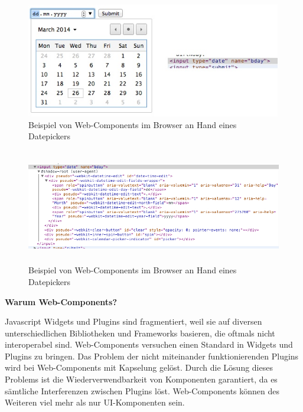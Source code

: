 \begin{figure}[h]
\centering
\includegraphics[height=5.0cm]{images/datepicker.jpg}
\caption[
Beispiel von Web-Components im Browser an Hand eines Datepickers, Urldate: 04.2014
\newline
\small\texttt{\url{https://s3.amazonaws.com/infinum.web.production/repository\_items/files/000/000/238/original/datepicker.jpg}}
]{Beispiel von Web-Components im Browser an Hand eines Datepickers}
\label{fig:3_Datepicker_Visuals}
\end{figure}

\begin{figure}[h]
\centering
\includegraphics[height=5.0cm]{images/datepicker_shadow_dom.jpg}
\caption[
Beispiel von Web-Components im Browser an Hand eines Datepickers, Urldate: 04.2014
\newline
\small\texttt{\url{https://s3.amazonaws.com/infinum.web.production/repository\_items/files/000/000/236/original/datepicker\_shadow\_dom.jpg}}
]{Beispiel von Web-Components im Browser an Hand eines Datepickers}
\label{fig:3_Datepicker_Source}
\end{figure}

\textbf{Warum Web-Components?}

Javascript Widgets und Plugins sind fragmentiert, weil sie auf diversen unterschiedlichen Bibliotheken und Frameworks basieren, die oftmals nicht interoperabel sind. Web-Components versuchen einen Standard in Widgets und Plugins zu bringen. Das Problem der nicht miteinander funktionierenden Plugins wird bei Web-Components mit Kapselung gelöst. Durch die Lösung dieses Problems ist die Wiederverwendbarkeit von Komponenten garantiert, da es sämtliche Interferenzen zwischen Plugins löst. Web-Components können des Weiteren viel mehr als nur UI-Komponenten sein.

